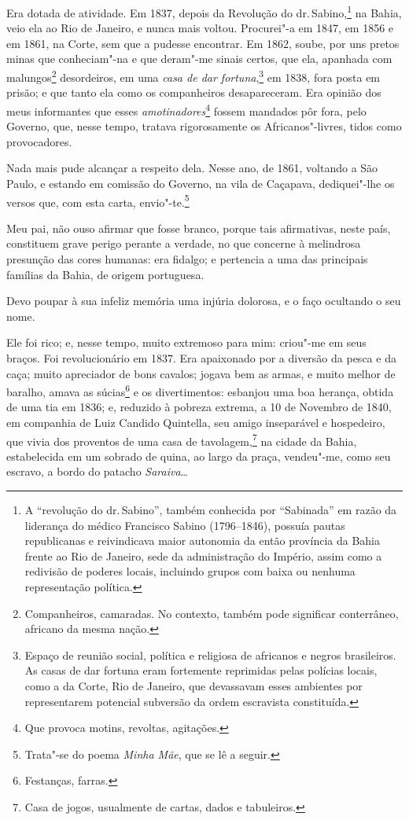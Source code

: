 Era dotada de atividade. Em 1837, depois da Revolução do dr.\,Sabino,\footnote{A ``revolução do dr.\,Sabino'', também conhecida por
  ``Sabinada'' em razão da liderança do médico Francisco Sabino
  (1796--1846), possuía pautas republicanas e reivindicava maior
  autonomia da então província da Bahia frente ao Rio de Janeiro, sede
  da administração do Império, assim como a redivisão de poderes locais,
  incluindo grupos com baixa ou nenhuma representação política.} na
Bahia, veio ela ao Rio de Janeiro, e nunca mais voltou. Procurei"-a em
1847, em 1856 e em 1861, na Corte, sem que a pudesse encontrar. Em 1862,
soube, por uns pretos minas que conheciam"-na e que deram"-me sinais
certos, que ela, apanhada com malungos\footnote{Companheiros,
  camaradas. No contexto, também pode significar conterrâneo, africano
  da mesma nação.} desordeiros, em uma \emph{casa de dar
fortuna},\footnote{Espaço de reunião social, política e religiosa de
  africanos e negros brasileiros. As casas de dar fortuna eram
  fortemente reprimidas pelas polícias locais, como a da Corte, Rio de
  Janeiro, que devassavam esses ambientes por representarem potencial
  subversão da ordem escravista constituída.} em 1838, fora posta em
prisão; e que tanto ela como os companheiros desapareceram. Era opinião
dos meus informantes que esses \emph{amotinadores}\footnote{Que
  provoca motins, revoltas, agitações.} fossem mandados pôr fora, pelo
Governo, que, nesse tempo, tratava rigorosamente os Africanos"-livres,
tidos como provocadores.

Nada mais pude alcançar a respeito dela. Nesse ano, de 1861, voltando a
São Paulo, e estando em comissão do Governo, na vila de Caçapava,
dediquei"-lhe os versos que, com esta carta, envio"-te.\footnote{Trata"-se
  do poema \emph{Minha Mãe}, que se lê a seguir.}

Meu pai, não ouso afirmar que fosse branco, porque tais afirmativas,
neste país, constituem grave perigo perante a verdade, no que concerne à
melindrosa presunção das cores humanas: era fidalgo; e pertencia a uma
das principais famílias da Bahia, de origem portuguesa.

Devo poupar à sua infeliz memória uma injúria dolorosa, e o faço
ocultando o seu nome.

Ele foi rico; e, nesse tempo, muito extremoso para mim: criou"-me em seus
braços. Foi revolucionário em 1837. Era apaixonado por a diversão da
pesca e da caça; muito apreciador de bons cavalos; jogava bem as armas,
e muito melhor de baralho, amava as súcias\footnote{Festanças, farras.}
e os divertimentos: esbanjou uma boa herança, obtida de uma tia em 1836;
e, reduzido à pobreza extrema, a 10 de Novembro de 1840, em companhia de
Luiz Candido Quintella, seu amigo inseparável e hospedeiro, que vivia
dos proventos de uma casa de tavolagem,\footnote{Casa de jogos,
  usualmente de cartas, dados e tabuleiros.} na cidade da Bahia,
estabelecida em um sobrado de quina, ao largo da praça, vendeu"-me, como
seu escravo, a bordo do patacho \emph{Saraiva}\ldots{}

